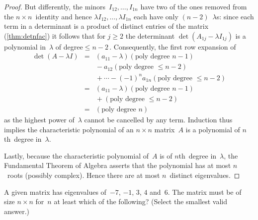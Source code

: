 \begin{proof}
But differently, the minors~\(I_{12},\ldots,I_{1n}\) have two of the ones removed from the \(n\times n\)~identity and hence \(\lambda I_{12},\ldots,\lambda I_{1n}\) each have only \((n-2)\)~\(\lambda\)s: since each term in a determinant is a product of distinct entries of the matrix (\autoref{thm:detnfac}) it follows that for \(j\geq2\) the determinant \(\det(A_{1j}-\lambda I_{1j})\) is a polynomial in~\(\lambda\) of degree\({}\leq n-2\)\,.
Consequently, the first row expansion of 
\begin{eqnarray*}
\det(A-\lambda I)
&=&(a_{11}-\lambda)(\text{poly degree }n-1)
\\&&{}
-a_{12}(\text{poly degree }\leq n-2)
\\&&{}
+\cdots-(-1)^{n}a_{1n}(\text{poly degree }\leq n-2)
\\&=&(a_{11}-\lambda)(\text{poly degree }n-1)
\\&&{}
+(\text{poly degree }\leq n-2)
\\&=&(\text{poly degree }n)
\end{eqnarray*}
as the highest power of~\(\lambda\) cannot be cancelled by any term.
Induction thus implies the characteristic polynomial of an \(n\times n\) matrix~\(A\) is a polynomial of \(n\)th~degree in~\(\lambda\).

Lastly, because the characteristic polynomial of~\(A\) is of \(n\)th~degree in~\(\lambda\), the Fundamental Theorem of Algebra asserts that the polynomial has at most \(n\)~roots (possibly complex).  
Hence there are at most \(n\)~distinct eigenvalues.
\end{proof}



\begin{activity}
A given matrix has eigenvalues of~\(-7\), \(-1\), \(3\), \(4\)  and~\(6\).
The matrix must be of size \(n\times n\) for~\(n\) at least which of the following? (Select the smallest valid answer.)
\end{activity}



